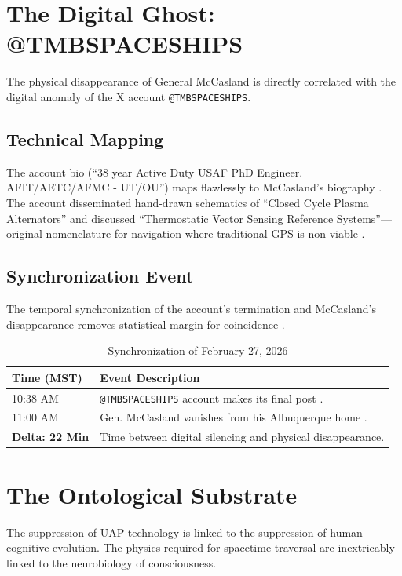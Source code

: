 \documentclass[11pt,a4paper]{article}
\begin{document}
\section{The Digital Ghost: @TMBSPACESHIPS}
The physical disappearance of General McCasland is directly correlated with the digital anomaly of the X account \texttt{@TMBSPACESHIPS}.

\subsection{Technical Mapping}\label{sec:technical-mapping}
The account bio (``38 year Active Duty USAF PhD Engineer. AFIT/AETC/AFMC - UT/OU'') maps flawlessly to McCasland's biography \cite{DG-1, SC-3}. The account disseminated hand-drawn schematics of ``Closed Cycle Plasma Alternators'' and discussed ``Thermostatic Vector Sensing Reference Systems''—original nomenclature for navigation where traditional GPS is non-viable \cite{DG-1}.

\subsection{Synchronization Event}\label{sec:synchronization}
The temporal synchronization of the account's termination and McCasland's disappearance removes statistical margin for coincidence \cite{DG-2}.

\begin{table}[h]
\centering
\caption{Synchronization of February 27, 2026}
\begin{tabular}{ll}
\toprule
\textbf{Time (MST)} & \textbf{Event Description} \\
\midrule 
10:38 AM & \texttt{@TMBSPACESHIPS} account makes its final post \cite{DG-2}. \\
11:00 AM & Gen. McCasland vanishes from his Albuquerque home \cite{DG-2, SC-3}. \\
\midrule
\textbf{Delta: 22 Min} & Time between digital silencing and physical disappearance. \\
\bottomrule
\end{tabular}
\end{table} 

\section{The Ontological Substrate}
The suppression of UAP technology is linked to the suppression of human cognitive evolution. The physics required for spacetime traversal are inextricably linked to the neurobiology of consciousness.
\end{document}
